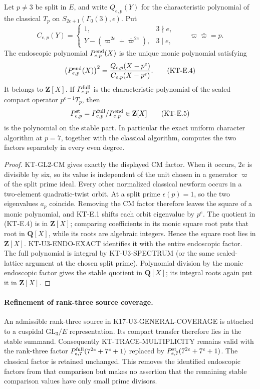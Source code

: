 \begin{corollary}
Let $p\ne3$ be split in $E$, and write $Q_{e,p}(Y)$ for the
characteristic polynomial of the classical $T_p$ on
$S_{2e+1}(\Gamma_0(3),\epsilon)$. Put
\[
 C_{e,p}(Y)=
 \begin{cases}
 1,&3\nmid e,\\
 Y-(\varpi^{2e}+\bar\varpi^{2e}),&3\mid e,
 \end{cases}
 \qquad \varpi\bar\varpi=p.
\]
The endoscopic polynomial $P^{\rm end}_{e,p}(X)$ is the unique
monic polynomial satisfying
\[
 \bigl(P^{\rm end}_{e,p}(X)\bigr)^2
       =\frac{Q_{e,p}(X-p^e)}{C_{e,p}(X-p^e)}.             \tag{KT-E.4}
\]
It belongs to $\mathbf Z[X]$. If $P^{\rm full}_{e,p}$ is the
characteristic polynomial of the scaled compact operator
$p^{e-1}T_p$, then
\[
 P^{\rm st}_{e,p}=P^{\rm full}_{e,p}/P^{\rm end}_{e,p}
       \in\mathbf Z[X]                                  \tag{KT-E.5}
\]
is the polynomial on the stable part. In particular the exact
uniform character algorithm at $p=7$, together with the classical
algorithm, computes the two factors separately in every even degree.
\end{corollary}
\begin{proof}
KT-GL2-CM gives exactly the displayed CM factor. When it occurs,
$2e$ is divisible by six, so its value is independent of the unit
chosen in a generator $\varpi$ of the split prime ideal.
Every other normalized classical newform occurs in a two-element
quadratic-twist orbit. At a split prime $\epsilon(p)=1$, so the
two eigenvalues $a_p$ coincide. Removing the CM factor therefore
leaves the square of a monic polynomial, and KT-E.1 shifts each
orbit eigenvalue by $p^e$. The quotient in (KT-E.4) is in
$\mathbf Z[X]$; comparing coefficients in its monic square root
puts that root in $\mathbf Q[X]$, while its roots are algebraic
integers. Hence the square root lies in $\mathbf Z[X]$.
KT-U3-ENDO-EXACT identifies it with the entire endoscopic factor.
The full polynomial is integral by KT-U3-SPECTRUM (or the same
scaled-lattice argument at the chosen split prime). Polynomial
division by the monic endoscopic factor gives the stable quotient
in $\mathbf Q[X]$; its integral roots again put it in
$\mathbf Z[X]$.
\end{proof}

\paragraph{Refinement of rank-three source coverage.}
An admissible rank-three source in K17-U3-GENERAL-COVERAGE
is attached to a cuspidal $\mathrm{GL}_3/E$ representation.
Its compact transfer therefore lies in the stable summand.
Consequently KT-TRACE-MULTIPLICITY remains valid with the
rank-three factor $P^{\rm full}_{e,7}(7^{2e}+7^e+1)$ replaced
by $P^{\rm st}_{e,7}(7^{2e}+7^e+1)$. The classical factor
is retained unchanged. This removes the identified endoscopic
factors from that comparison but makes no assertion that the
remaining stable comparison values have only small prime divisors.

